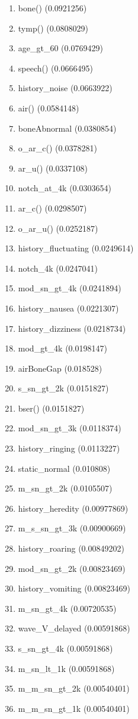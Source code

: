 \begin{enumerate}
\item bone() (0.0921256)
\item tymp() (0.0808029)
\item age\_gt\_60 (0.0769429)
\item speech() (0.0666495)
\item history\_noise (0.0663922)
\item air() (0.0584148)
\item boneAbnormal (0.0380854)
\item o\_ar\_c() (0.0378281)
\item ar\_u() (0.0337108)
\item notch\_at\_4k (0.0303654)
\item ar\_c() (0.0298507)
\item o\_ar\_u() (0.0252187)
\item history\_fluctuating (0.0249614)
\item notch\_4k (0.0247041)
\item mod\_sn\_gt\_4k (0.0241894)
\item history\_nausea (0.0221307)
\item history\_dizziness (0.0218734)
\item mod\_gt\_4k (0.0198147)
\item airBoneGap (0.018528)
\item s\_sn\_gt\_2k (0.0151827)
\item bser() (0.0151827)
\item mod\_sn\_gt\_3k (0.0118374)
\item history\_ringing (0.0113227)
\item static\_normal (0.010808)
\item m\_sn\_gt\_2k (0.0105507)
\item history\_heredity (0.00977869)
\item m\_s\_sn\_gt\_3k (0.00900669)
\item history\_roaring (0.00849202)
\item mod\_sn\_gt\_2k (0.00823469)
\item history\_vomiting (0.00823469)
\item m\_sn\_gt\_4k (0.00720535)
\item wave\_V\_delayed (0.00591868)
\item s\_sn\_gt\_4k (0.00591868)
\item m\_sn\_lt\_1k (0.00591868)
\item m\_m\_sn\_gt\_2k (0.00540401)
\item m\_m\_sn\_gt\_1k (0.00540401)

\end{enumerate}
